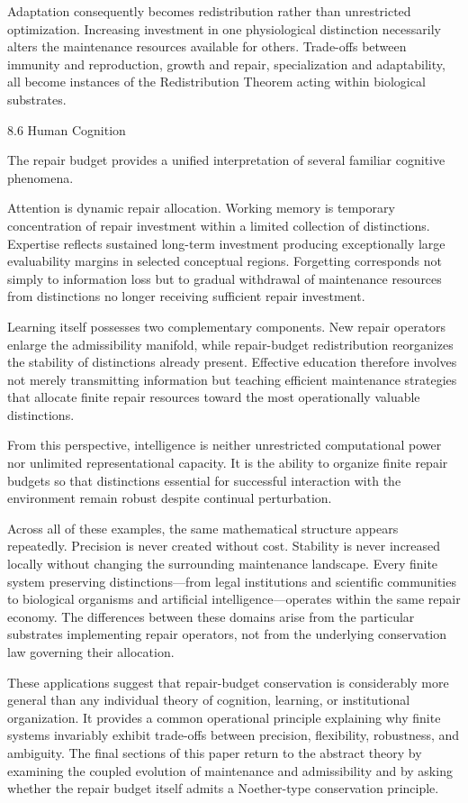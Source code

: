 \documentclass[12pt,oneside]{article}
\theoremstyle{plain}
\theoremstyle{definition}
\theoremstyle{remark}
\begin{document}
Adaptation consequently becomes redistribution rather than unrestricted optimization. Increasing investment in one physiological distinction necessarily alters the maintenance resources available for others. Trade-offs between immunity and reproduction, growth and repair, specialization and adaptability, all become instances of the Redistribution Theorem acting within biological substrates.

8.6 Human Cognition

The repair budget provides a unified interpretation of several familiar cognitive phenomena.

Attention is dynamic repair allocation. Working memory is temporary concentration of repair investment within a limited collection of distinctions. Expertise reflects sustained long-term investment producing exceptionally large evaluability margins in selected conceptual regions. Forgetting corresponds not simply to information loss but to gradual withdrawal of maintenance resources from distinctions no longer receiving sufficient repair investment.

Learning itself possesses two complementary components. New repair operators enlarge the admissibility manifold, while repair-budget redistribution reorganizes the stability of distinctions already present. Effective education therefore involves not merely transmitting information but teaching efficient maintenance strategies that allocate finite repair resources toward the most operationally valuable distinctions.

From this perspective, intelligence is neither unrestricted computational power nor unlimited representational capacity. It is the ability to organize finite repair budgets so that distinctions essential for successful interaction with the environment remain robust despite continual perturbation.

Across all of these examples, the same mathematical structure appears repeatedly. Precision is never created without cost. Stability is never increased locally without changing the surrounding maintenance landscape. Every finite system preserving distinctions—from legal institutions and scientific communities to biological organisms and artificial intelligence—operates within the same repair economy. The differences between these domains arise from the particular substrates implementing repair operators, not from the underlying conservation law governing their allocation.

These applications suggest that repair-budget conservation is considerably more general than any individual theory of cognition, learning, or institutional organization. It provides a common operational principle explaining why finite systems invariably exhibit trade-offs between precision, flexibility, robustness, and ambiguity. The final sections of this paper return to the abstract theory by examining the coupled evolution of maintenance and admissibility and by asking whether the repair budget itself admits a Noether-type conservation principle.
\end{document}
